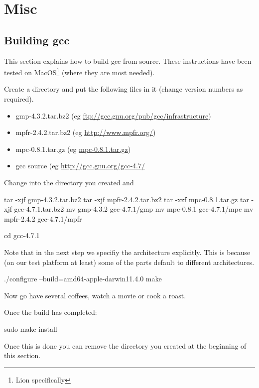 \chapter{Misc}


\section{Building gcc}\label{sec:gccbuilding}
This section explains how to build gcc from source.
These instructions have been tested on MacOS\footnote{Lion specifically} (where they are most needed).

Create a directory and put the following files in it (change version numbers as required).
\begin{itemize}
 \item gmp-4.3.2.tar.bz2 (eg \url{ftp://gcc.gnu.org/pub/gcc/infrastructure})
 \item mpfr-2.4.2.tar.bz2 (eg \url{http://www.mpfr.org/})
 \item mpc-0.8.1.tar.gz (eg \url{mpc-0.8.1.tar.gz})
 \item gcc source (eg \url{http://gcc.gnu.org/gcc-4.7/}
\end{itemize}

Change into the directory you created and
\begin{shellCode}
tar -xjf gmp-4.3.2.tar.bz2
tar -xjf mpfr-2.4.2.tar.bz2
tar -xzf mpc-0.8.1.tar.gz
tar -xjf gcc-4.7.1.tar.bz2
mv gmp-4.3.2 gcc-4.7.1/gmp
mv mpc-0.8.1 gcc-4.7.1/mpc
mv mpfr-2.4.2 gcc-4.7.1/mpfr

cd gcc-4.7.1
\end{shellCode}

\noindent Note that in the next step we specifiy the architecture explicitly.
This is because (on our test platform at least) some of the parts default to different architectures.

\begin{shellCode}
./configure --build=amd64-apple-darwin11.4.0
make 
\end{shellCode}

\noindent Now go have several coffees, watch a movie or cook a roast.

\noindent Once the build has completed:
\begin{shellCode}
sudo make install 
\end{shellCode}

\noindent Once this is done you can remove the directory you created at the beginning of this section.
